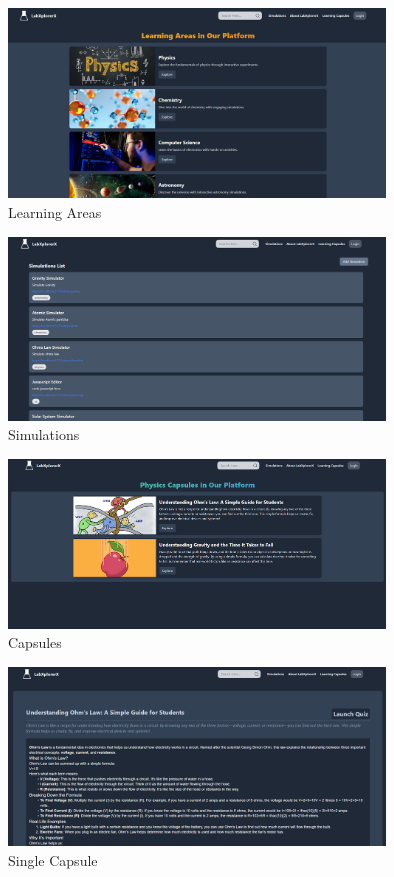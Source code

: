  \begin{figure}[H]
    \centering
     \includegraphics[width = 10cm]{Diagrams/output/learningareas.png}
     \caption{Learning Areas}
 \end{figure}


 \begin{figure}[H]
    \centering
     \includegraphics[width = 10cm]{Diagrams/output/simulations.png}
     \caption{Simulations}
 \end{figure}

 \begin{figure}[H]
    \centering
     \includegraphics[width = 10cm]{Diagrams/output/capsules.png}
     \caption{Capsules}
 \end{figure}

 \begin{figure}[H]
    \centering
     \includegraphics[width = 10cm]{Diagrams/output/capsule.png}
     \caption{Single Capsule}
 \end{figure}

